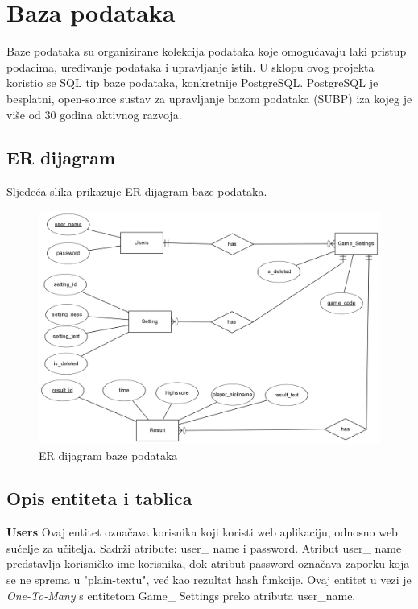 \documentclass[times, utf8, zavrsni, numeric]{fer}
\begin{document}
	
\chapter{Baza podataka}
	Baze podataka su organizirane kolekcija podataka koje omogućavaju laki pristup podacima, uređivanje podataka i upravljanje istih. U sklopu ovog projekta koristio se
	SQL tip baze podataka, konkretnije PostgreSQL. PostgreSQL je besplatni, open-source sustav za upravljanje bazom podataka (SUBP) iza kojeg je više od 30 godina aktivnog razvoja.
	
	
	\section{ER dijagram}
		Sljedeća slika prikazuje ER dijagram baze podataka.
		\begin{figure}[H]
			\includegraphics[width=\linewidth]{"slike/ER.png"} 
			\centering
			\caption{ER dijagram baze podataka}
			\label{fig:erdijagram}
		\end{figure}

	
	\section{Opis entiteta i tablica}
			\textbf {Users} \hspace{5mm}
			{Ovaj entitet označava korisnika koji koristi web aplikaciju, odnosno web sučelje za učitelja. Sadrži atribute: user\_ name i password.
			Atribut user\_ name predstavlja korisničko ime korisnika, dok atribut password označava zaporku koja se ne sprema u "plain-textu", već kao 
			rezultat hash funkcije.
			Ovaj entitet u vezi je \textit{One-To-Many} s entitetom Game\_ Settings preko atributa user\_name.}
				
\end{document}
